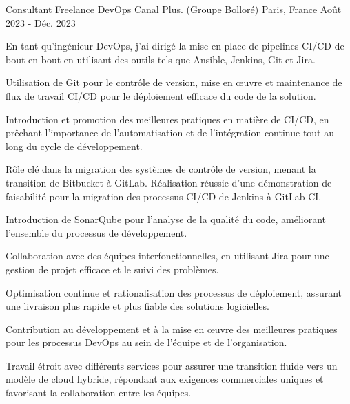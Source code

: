 \begin{cventries}
\cventry
{Consultant Freelance DevOps} %
{Canal Plus. (Groupe Bolloré)} %
{Paris, France} %
{Août 2023 - Déc. 2023} %
{
  \begin{cvitems} %
    \item {En tant qu'ingénieur DevOps, j'ai dirigé la mise en place de pipelines CI/CD de bout en bout en utilisant des outils tels que Ansible, Jenkins, Git et Jira.}
    \item {Utilisation de Git pour le contrôle de version, mise en œuvre et maintenance de flux de travail CI/CD pour le déploiement efficace du code de la solution.}
    \item {Introduction et promotion des meilleures pratiques en matière de CI/CD, en prêchant l'importance de l'automatisation et de l'intégration continue tout au long du cycle de développement.}
    \item {Rôle clé dans la migration des systèmes de contrôle de version, menant la transition de Bitbucket à GitLab. Réalisation réussie d'une démonstration de faisabilité pour la migration des processus CI/CD de Jenkins à GitLab CI.}
    \item {Introduction de SonarQube pour l'analyse de la qualité du code, améliorant l'ensemble du processus de développement.}
    \item {Collaboration avec des équipes interfonctionnelles, en utilisant Jira pour une gestion de projet efficace et le suivi des problèmes.}
    \item {Optimisation continue et rationalisation des processus de déploiement, assurant une livraison plus rapide et plus fiable des solutions logicielles.}
    \item {Contribution au développement et à la mise en œuvre des meilleures pratiques pour les processus DevOps au sein de l'équipe et de l'organisation.}
    \item {Travail étroit avec différents services pour assurer une transition fluide vers un modèle de cloud hybride, répondant aux exigences commerciales uniques et favorisant la collaboration entre les équipes.}
  \end{cvitems}        
}


\end{cventries}
